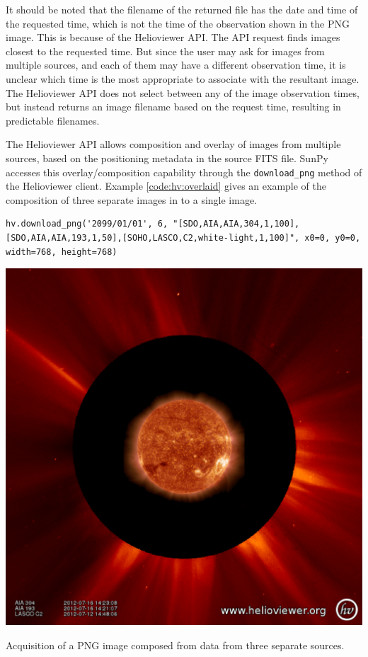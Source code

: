 It should be noted that the filename of the returned file has the date
and time of the requested time, which is not the time of the
observation shown in the PNG image.  This is because of the
Helioviewer API.  The API request finds images closest to the
requested time. But since the user may ask for images from multiple
sources, and each of them may have a different observation time, it is
unclear which time is the most appropriate to associate with the
resultant image.  The Helioviewer API does not select between any of
the image observation times, but instead returns an image filename
based on the request time, resulting in predictable filenames.

The Helioviewer API allows composition and overlay of images from
multiple sources, based on the positioning metadata in the source FITS
file.  SunPy accesses this overlay/composition capability through the
\texttt{download\_png} method of the Helioviewer client.  Example
\ref{code:hv:overlaid} gives an example of the composition of three
separate images in to a single image.

\begin{listing}
\begin{verbatim}
hv.download_png('2099/01/01', 6, "[SDO,AIA,AIA,304,1,100],[SDO,AIA,AIA,193,1,50],[SOHO,LASCO,C2,white-light,1,100]", x0=0, y0=0, width=768, height=768)
\end{verbatim}
\includegraphics[width=0.8\columnwidth]{helioviewer_overlay_example.eps}
\caption{Acquisition of a PNG image composed from data from three
  separate sources.}
\label{code:hv:overlaid}
\end{listing}

